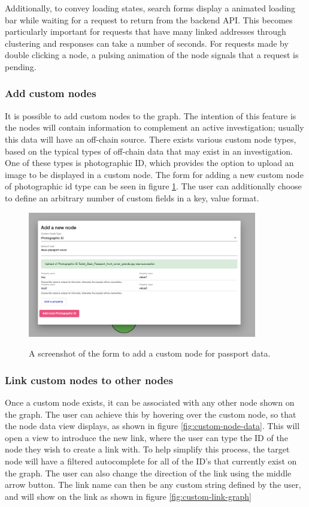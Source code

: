 Additionally, to convey loading states, search forms display a animated loading bar while waiting for a request to return from the backend API. This becomes particularly important for requests that have many linked addresses through clustering and responses can take a number of seconds. For requests made by double clicking a node, a pulsing animation of the node signals that a request is pending.

\subsubsection{Add custom nodes}
It is possible to add custom nodes to the graph. The intention of this feature is the nodes will contain information to complement an active investigation; usually this data will have an off-chain source. There exists various custom node types, based on the typical types of off-chain data that may exist in an investigation. One of these types is photographic ID, which provides the option to upload an image to be displayed in a custom node. The form for adding a new custom node of photographic id type can be seen in figure \ref{fig:add-passport-form}. The user can additionally choose to define an arbitrary number of custom fields in a key, value format. 

\begin{figure}[h!]
  \centering
  \includegraphics[width = 10cm]{./figures/ui-screenshots/add-passport-form-success}\\[0.5cm] 
  \caption{A screenshot of the form to add a custom node for passport data.}
  \label{fig:add-passport-form}
\end{figure}

\subsubsection{Link custom nodes to other nodes}
Once a custom node exists, it can be associated with any other node shown on the graph. The user can achieve this by hovering over the custom node, so that the node data view displays, as shown in figure \ref{fig:custom-node-data}. This will open a view to introduce the new link, where the user can type the ID of the node they wish to create a link with. To help simplify this process, the target node will have a filtered autocomplete for all of the ID's that currently exist on the graph. The user can also change the direction of the link using the middle arrow button. The link name can then be any custom string defined by the user, and will show on the link as shown in figure \ref{fig:custom-link-graph}


